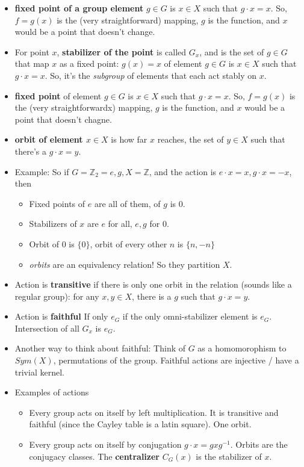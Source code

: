\documentclass[11pt, oneside]{article}   	%
\begin{document}
\begin{itemize}
\item \textbf{fixed point of a group element} $g \in G$ is $x \in X$ such that $g \cdot x = x$.  So, $f = g(x)$ is the (very straightforward) mapping, $g$ is the function, and $x$ would be a point that doesn't change.
\item For point $x$, \textbf{stabilizer of the point} is called $G_x$, and is the set of $g \in G$ that map $x$ as a fixed point: $g(x) = x$ of element $g \in G$ is $x \in X$ such that $g \cdot x = x$.  So, it's the \emph{subgroup} of elements that each act stably on $x$.
\item \textbf{fixed point} of element $g \in G$ is $x \in X$ such that $g \cdot x = x$.  So, $f = g(x)$ is the (very straightforwardx) mapping, $g$ is the function, and $x$ would be a point that doesn't chagne.
\item \textbf{orbit of element $x \in X$} is how far $x$ reaches, the set of $y \in X$ such that there's a $g \cdot x = y$.
\item Example: So if $G = \mathbb{Z}_2 = {e, g}, X = \mathbb{Z}$, and the action is $e \cdot x = x, g \cdot x = -x$, then
  \begin{itemize}
  \item Fixed points of $e$ are all of them, of $g$ is 0.
  \item Stabilizers of $x$ are $e$ for all, $e,g$ for 0.
  \item Orbit of 0 is $\{0\}$, orbit of every other $n$ is $\{n, -n\}$
  \item \emph{orbits} are an equivalency relation!  So they partition $X$.
  \end{itemize}
 \item Action is \textbf{transitive} if there is only one orbit in the relation (sounds like a regular group): for any $x, y \in X$, there is a $g$ such that $g \cdot x = y$.
 \item Action is \textbf{faithful} If only $e_G$ if the only omni-stabilizer element is $e_G$.  Intersection of all $G_x$ is $e_G$.
 \item Another way to think about faithful: Think of $G$ as a homomorophism to $Sym(X)$, permutations of the group.  Faithful actions are injective / have a trivial kernel.
\item Examples of actions 
  \begin {itemize}
  \item Every group acts on itself by left multiplication.  It is transitive and faithful (since the Cayley table is a latin square).  One orbit.
  \item Every group acts on itself by conjugation $g \cdot x = g x g^{-1}$. Orbits are the conjugacy classes.  The \textbf{centralizer} $C_G(x)$ is the stabilizer of $x$.

\end{itemize}
\end{itemize}
\end{document}
